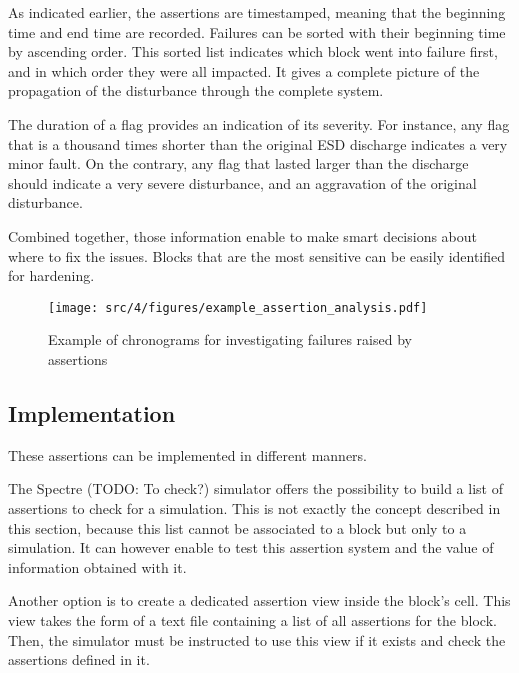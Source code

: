 As indicated earlier, the assertions are timestamped, meaning that the beginning time and end time are recorded.
Failures can be sorted with their beginning time by ascending order.
This sorted list indicates which block went into failure first, and in which order they were all impacted.
It gives a complete picture of the propagation of the disturbance through the complete system.

The duration of a flag provides an indication of its severity.
For instance, any flag that is a thousand times shorter than the original \gls{ESD} discharge indicates a very minor fault.
On the contrary, any flag that lasted larger than the discharge should indicate a very severe disturbance, and an aggravation of the original disturbance.

Combined together, those information enable to make smart decisions about where to fix the issues.
Blocks that are the most sensitive can be easily identified for hardening.

\begin{figure}[!h]
  \centering
  \texttt{[image: src/4/figures/example\_assertion\_analysis.pdf]}
  \caption{Example of chronograms for investigating failures raised by assertions}
  \label{fig:ex-special-cells}
\end{figure}


\subsection{Implementation}

These assertions can be implemented in different manners.

The Spectre (TODO: To check?) simulator offers the possibility to build a list of assertions to check for a simulation.
This is not exactly the concept described in this section, because this list cannot be associated to a block but only to a simulation.
It can however enable to test this assertion system and the value of information obtained with it.

Another option is to create a dedicated assertion view inside the block's cell.
This view takes the form of a text file containing a list of all assertions for the block.
Then, the simulator must be instructed to use this view if it exists and check the assertions defined in it.

